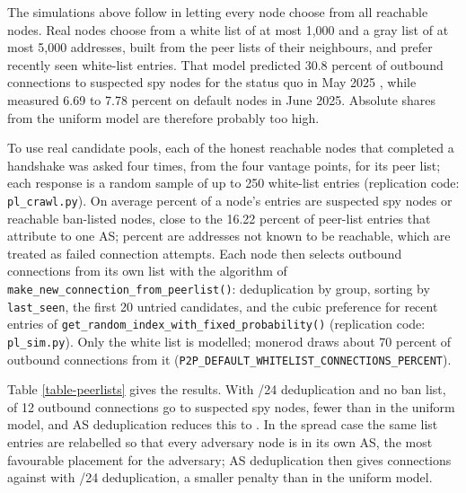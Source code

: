 \documentclass[english]{mrl}
\theoremstyle{plain}
\begin{document}
The simulations above follow \cite{Rucknium2025} in letting every node choose from all reachable nodes. Real nodes choose from a white list of at most 1,000 and a gray list of at most 5,000 addresses, built from the peer lists of their neighbours, and prefer recently seen white-list entries. That model predicted 30.8 percent of outbound connections to suspected spy nodes for the status quo in May 2025 \cite{Rucknium2025}, while \cite{Kopyciok2026} measured 6.69 to 7.78 percent on default nodes in June 2025. Absolute shares from the uniform model are therefore probably too high.

To use real candidate pools, each of the \plNodes{} honest reachable nodes that completed a handshake was asked four times, from the four vantage points, for its peer list; each response is a random sample of up to 250 white-list entries (replication code: \texttt{pl\_crawl.py}). On average \plListSpy{} percent of a node's entries are suspected spy nodes or reachable ban-listed nodes, close to the 16.22 percent of peer-list entries that \cite{Kopyciok2026} attribute to one AS; \plUnknown{} percent are addresses not known to be reachable, which are treated as failed connection attempts. Each node then selects outbound connections from its own list with the algorithm of \texttt{make\_new\_connection\_from\_peerlist()}: deduplication by group, sorting by \texttt{last\_seen}, the first 20 untried candidates, and the cubic preference for recent entries of \texttt{get\_random\_index\_with\_fixed\_probability()} (replication code: \texttt{pl\_sim.py}). Only the white list is modelled; monerod draws about 70 percent of outbound connections from it (\texttt{P2P\_DEFAULT\_WHITELIST\_CONNECTIONS\_PERCENT}).

Table \ref{table-peerlists} gives the results. With /24 deduplication and no ban list, \plSubnetObs{} of 12 outbound connections go to suspected spy nodes, fewer than in the uniform model, and AS deduplication reduces this to \plAsmapObs. In the spread case the same list entries are relabelled so that every adversary node is in its own AS, the most favourable placement for the adversary; AS deduplication then gives \plAsmapSpr{} connections against \plSubnetSpr{} with /24 deduplication, a smaller penalty than in the uniform model.
\end{document}
